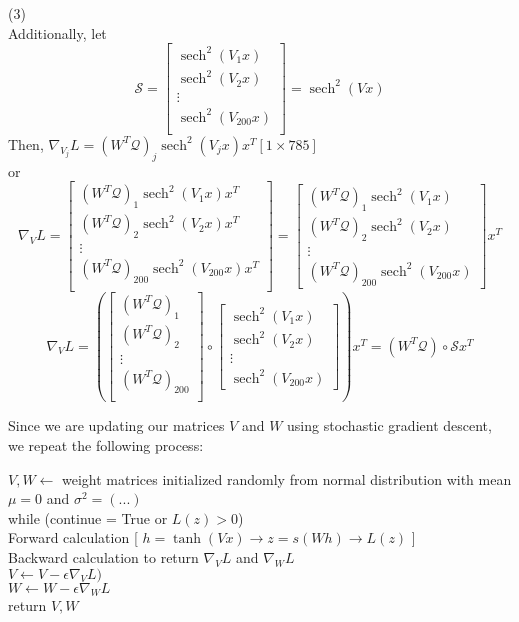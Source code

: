 \documentclass[landscape]{report}
\DeclareMathOperator{\sech}{sech} %
\newcommand{\tab}{\-\hspace{0.5cm}}
\newcommand{\sep}{\-\hspace{0.3cm}}
\begin{document}
(3)\\
Additionally, let
$$ \mathcal{S} = \begin{bmatrix}
\sech^2(V_1 x) \\
\sech^2(V_2 x) \\
\vdots \\
\sech^2(V_{200} x)\\
\end{bmatrix} = \sech^2(Vx) $$
Then, $\nabla_{V_j} L = (W^T \mathcal{Q})_j \sech^2(V_jx)x^T $\tab\footnotesize$[1\times785]$\normalsize\\
\tab or
$$ \nabla_{V} L = \begin{bmatrix}
(W^T \mathcal{Q})_1 \sech^2(V_1 x)x^T \\
(W^T \mathcal{Q})_2 \sech^2(V_2 x)x^T \\
\vdots \\
(W^T \mathcal{Q})_{200} \sech^2(V_{200}x)x^T \\
\end{bmatrix} = \begin{bmatrix}
(W^T \mathcal{Q})_1 \sech^2(V_1 x) \\
(W^T \mathcal{Q})_2 \sech^2(V_2 x) \\
\vdots \\
(W^T \mathcal{Q})_{200} \sech^2(V_{200}x)
\end{bmatrix} x^T $$
$$\nabla_{V} L = \left(\begin{bmatrix}
(W^T \mathcal{Q})_1 \\
(W^T \mathcal{Q})_2 \\
\vdots \\
(W^T \mathcal{Q})_{200} \\
\end{bmatrix} \circ \begin{bmatrix}
\sech^2(V_1 x) \\
\sech^2(V_2 x) \\
\vdots \\
\sech^2(V_{200}x)
\end{bmatrix}\right) x^T = (W^T \mathcal{Q}) \circ \mathcal{S} x^T $$

\newpage
Since we are updating our matrices $V$ and $W$ using stochastic gradient descent, we repeat the following process:

\tab $V,W \leftarrow$ weight matrices initialized randomly from normal distribution with mean $\mu=0$ and $
\sigma^2 = (...)$\\
\tab while (continue = True or $L(z) > 0$) \\
\tab \tab \tab Forward calculation [ $h = \tanh(Vx)$\sep$\rightarrow$\sep$z = s(Wh)$\sep$\rightarrow$\sep$L(z)$ ]\\
\tab \tab \tab Backward calculation to return $\nabla_V L$ and $\nabla_W L$\\
\tab \tab \tab $V \leftarrow V - \epsilon \nabla_V L)$ \\
\tab \tab \tab $W \leftarrow W - \epsilon \nabla_W L$ \\
\tab return $V,W$ \\
\end{document}
